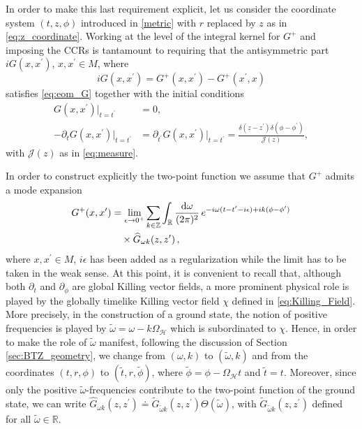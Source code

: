 \documentclass[aps, prd, amsmath, floats, floatfix, twocolumn, nofootinbib, superscriptaddress, showpacs]{revtex4-1}
\def\bR{{\mathbb R}}
\begin{document}
In order to make this last requirement explicit, let us consider the coordinate system $(t,z,\phi)$ introduced in \eqref{metric} with $r$ replaced by $z$ as in \eqref{eq:z_coordinate}. Working at the level of the integral kernel for $G^+$ and imposing the CCRs is tantamount to requiring that the antisymmetric part  $iG(x,x^\prime)$, $x,x^\prime\in M$, where 
$$ i G(x,x^\prime) = G^+(x,x^\prime)-G^+(x^\prime,x)$$
satisfies \eqref{eq:eom_G} together with the initial conditions
%
\begin{subequations} \label{eq:initial_conditions_E}
\begin{align} 
G(x,x^\prime)|_{t=t^\prime} &= 0, \label{eq:initial_conditions_E_1} \\
-\partial_t  G(x,x^\prime)|_{t=t^\prime} &=\partial_{t^\prime}G(x,x^\prime)|_{t=t^\prime}=\frac{\delta(z-z^\prime)\delta(\phi-\phi^\prime)}{\mathcal{J}(z)}, \label{eq:initial_conditions_E_2}
\end{align}
\end{subequations}
%
with $\mathcal{J}(z)$ as in \eqref{eq:measure}.

In order to construct explicitly the two-point function we assume that $G^+$ admits a mode expansion
%
\begin{align}
G^+(x,x^\prime) &= \lim_{\epsilon \to 0^+} \sum\limits_{k\in\mathbb{Z}} \int_\bR \frac{\dd\omega}{(2\pi)^2} \, e^{-i\omega (t-t^\prime-i\epsilon)+ik(\phi-\phi^\prime)} \notag \\
&\quad \times \widehat{G}_{\omega k}(z,z^\prime) \, , \label{eq:2-pt_modes}
\end{align}
%
where $x,x^\prime\in M$, $i\epsilon$ has been added as a regularization while the limit has to be taken in the weak sense. At this point, it is convenient to recall that, although both $\partial_t$ and $\partial_\phi$ are global Killing vector fields, a more prominent physical role is played by the globally timelike Killing vector field $\chi$ defined in \eqref{eq:Killing_Field}. More precisely, in the construction of a ground state, the notion of positive frequencies is played by $\tilde{\omega}=\omega-k\Omega_{\mathcal{H}}$ which is subordinated to $\chi$. Hence, in order to make the role of $\tilde{\omega}$ manifest, following the discussion of Section \ref{sec:BTZ_geometry}, we change from $(\omega, k)$ to $(\tilde{\omega},k)$ and from the coordinates $(t,r,\phi)$ to $(\tilde{t},r,\tilde{\phi})$, where $\tilde{\phi}=\phi-\Omega_{\mathcal{H}} t$ and $\tilde{t}=t$. Moreover, since only the positive $\tilde{\omega}$-frequencies contribute to the two-point function of the ground state, we can write $\widehat{G}_{\omega k}(z,z^\prime) \doteq \widetilde{G}_{\tilde{\omega} k}(z,z^\prime) \Theta(\tilde{\omega})$, with $\widetilde{G}_{\tilde{\omega} k}(z,z^\prime)$ defined for all $\tilde{\omega} \in \bR$.
\end{document}

